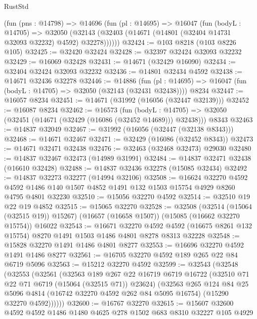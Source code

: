 \begin{lexlean}{RustStd}
\begin{coremodule}
    (fun (pns : @14798) =>
    @14696
      (fun (pl : @14695) =>
      @16047
        (fun (bodyL : @14705) =>
        @32050 (@32143 (@32403 (@14671 (@14801 (@32404 @14731 @32093 @32232) @4592) @32278))))))
@32424 := @103 @8218 (@103 @8226 @105)
@32425 := @32420 @32424
@32428 := @32397 @32424 @32093 @32232
@32429 := @16069 @32428
@32431 := @14671 (@32429 @16090)
@32434 := @32404 @32424 @32093 @32232
@32436 := @14801 @32434 @4592
@32438 := @14671 @32436 @32278
@32446 := @14886
    (fun (pl : @14695) => @16047 (fun (bodyL : @14705) => @32050 (@32143 (@32431 @32438))))
    @8234
@32447 := @16057 @8234
@32451 := @14671 (@31992 (@16056 (@32447 @32139)))
@32452 := @16087 @8234
@32462 := @16573
    (fun (bodyL : @14705) => @32050 (@32451 (@14671 (@32429 (@16086 (@32452 @14689))) @32438)))
    @8343
@32463 := @14837 @32049
@32467 := @31992 (@16056 (@32447 (@32138 @8343)))
@32468 := @14671 @32467
@32471 := @32429 (@16086 (@32452 @8343))
@32473 := @14671 @32471 @32438
@32476 := @32463 (@32468 @32473) @29030
@32480 := @14837 @32467 @32473 (@14989 @31991)
@32484 := @14837 @32471 @32438 (@16610 @32428)
@32488 := @14837 @32436 @32278 (@15085 @32434)
@32492 := @14837 @32273 @32277 (@14994 @32106)
@32508 := @16624
    @32270
    @4592
    @4592
    @1486
    @140
    @1507
    @4852
    @1491
    @132
    @1503
    @15754
    @4929
    @8260
    @4795
    @4801
    @32230
@32510 := @15056 @32270 @4592
@32514 := @32510 @19 @22 @19 @4852
@32515 := @15065 @32270
@32528 := @32508
    (@32514 (@15064 (@32515 @19)) @15267)
    (@16657 (@16658 @1507))
    (@15085 (@16662 @32270 @15754))
    @16022
@32543 := @16671
    @32270
    @4592
    @4592
    (@16675 @8261 @132 @15754)
    @8270
    @1491
    @1503
    @1486
    @4801
    @8278
    @8313
    @32228
@32548 := @15828 @32270 @1491 @1486 @4801 @8277
@32553 := @16696 @32270 @4592 @1491 @1486 @8277
@32561 := @16705 @32270 @4592 @189 @265 @22 @84 @6719 @5096
@32563 := @15212 @32270 @4592
@32599 := @32543
    (@32548
      (@32553
        (@32561
          (@32563
            @189
            @267
            @22
            @16719
            @6719
            @16722
            (@32510 @71 @22 @71 @6719 (@15064 (@32515 @71)) @23624)
            (@32563
              @265
              @124
              @84
              @25
              @5096
              @4814
              (@16742 @32270 @4592 @262 @84 @5095 @16754)
              (@15290 @32270 @4592))))))
@32600 := @16767 @32270
@32615 := @15607
    @32600
    @4592
    @4592
    @1486
    @1480
    @4625
    @278
    @1502
    @683
    @8310
    @32227
    @105
    @4929

\end{coremodule}
\end{lexlean}
